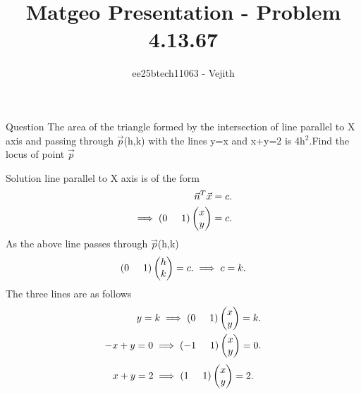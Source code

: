\documentclass{beamer}
\title{Matgeo Presentation - Problem 4.13.67}
\author{ee25btech11063 - Vejith}
\numberwithin{equation}{section}
\providecommand{\brak}[1]{\ensuremath{\left(#1\right)}}
\theoremstyle{remark}
\newcommand{\myvec}[1]{\ensuremath{\begin{pmatrix}#1\end{pmatrix}}}
\begin{document}
\frame{\titlepage}
\begin{frame}{Question}
The area of the triangle formed by the intersection of line parallel to X axis and passing through $\Vec{p}$(h,k) with the lines y=x and x+y=2 is 4h$^2$.Find the locus of point $\Vec{p}$
\end{frame}

\begin{frame}{Solution}
line parallel to X axis is of the form 
\begin{align}
    \Vec{n}^T\Vec{x}=c.\\
     \implies \brak{0\hspace{0.5cm}1}\myvec{x\\y}=c.
\end{align}
As the above line passes through $\Vec{p}$(h,k)
\begin{align}
     \brak{0\hspace{0.5cm}1}\myvec{h\\k}=c.
     \implies c=k.
\end{align}
The three lines are as follows
\begin{align}
    y=k\implies \brak{0\hspace{0.5cm}1}\myvec{x\\y}=k.\\
    -x+y=0 \implies \brak{-1\hspace{0.5cm}1}\myvec{x\\y}=0.
    \end{align}
    \begin{align}
    x+y=2 \implies\brak{1\hspace{0.5cm}1}\myvec{x\\y}=2.
\end{align}
    \end{frame}
\end{document}
